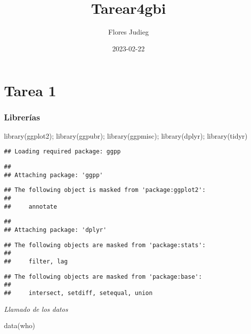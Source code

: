 \documentclass[
]{article}
\title{Tarear4gbi}
\author{Flores Judieg}
\date{2023-02-22}
\newenvironment{Shaded}{\begin{snugshade}}{\end{snugshade}}
\newcommand{\FunctionTok}[1]{\textcolor[rgb]{0.00,0.00,0.00}{#1}}
\newcommand{\NormalTok}[1]{#1}
\newcommand{\StringTok}[1]{\textcolor[rgb]{0.31,0.60,0.02}{#1}}
\begin{document}
\maketitle

\hypertarget{tarea-1}{%
\section{Tarea 1}\label{tarea-1}}

\hypertarget{libreruxedas}{%
\subsubsection{Librerías}\label{libreruxedas}}

\begin{Shaded}
\begin{Highlighting}[]
\FunctionTok{library}\NormalTok{(ggplot2); }\FunctionTok{library}\NormalTok{(ggpubr); }\FunctionTok{library}\NormalTok{(ggpmisc); }\FunctionTok{library}\NormalTok{(dplyr); }\FunctionTok{library}\NormalTok{(tidyr)}
\end{Highlighting}
\end{Shaded}

\begin{verbatim}
## Loading required package: ggpp
\end{verbatim}

\begin{verbatim}
## 
## Attaching package: 'ggpp'
\end{verbatim}

\begin{verbatim}
## The following object is masked from 'package:ggplot2':
## 
##     annotate
\end{verbatim}

\begin{verbatim}
## 
## Attaching package: 'dplyr'
\end{verbatim}

\begin{verbatim}
## The following objects are masked from 'package:stats':
## 
##     filter, lag
\end{verbatim}

\begin{verbatim}
## The following objects are masked from 'package:base':
## 
##     intersect, setdiff, setequal, union
\end{verbatim}

\emph{Llamado de los datos}

\begin{Shaded}
\begin{Highlighting}[]
\FunctionTok{data}\NormalTok{(}\StringTok{\textquotesingle{}who\textquotesingle{}}\NormalTok{)}
\end{Highlighting}
\end{Shaded}
\end{document}
